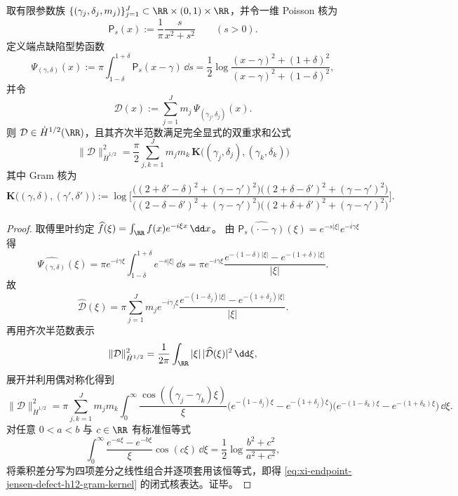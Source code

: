 \begin{proposition}\label{prop:xi-endpoint-jensen-defect-h12-gram-kernel}
取有限参数族 \(\{(\gamma_j,\delta_j,m_j)\}_{j=1}^{J}\subset \RR\times(0,1)\times\RR\)，并令一维 Poisson 核为
\[
\mathsf P_s(x):=\frac{1}{\pi}\frac{s}{x^2+s^2}\qquad(s>0).
\]
定义端点缺陷型势函数
\[
\Psi_{(\gamma,\delta)}(x)
:=\pi\int_{1-\delta}^{1+\delta}\mathsf P_s(x-\gamma)\,\dd s
=\frac12\log\frac{(x-\gamma)^2+(1+\delta)^2}{(x-\gamma)^2+(1-\delta)^2},
\]
并令
\[
\mathcal D(x):=\sum_{j=1}^{J} m_j\,\Psi_{(\gamma_j,\delta_j)}(x).
\]
则 \(\mathcal D\in \dot H^{1/2}(\RR)\)，且其齐次半范数满足完全显式的双重求和公式
\begin{equation}\label{eq:xi-endpoint-jensen-defect-h12-gram-kernel}
\boxed{\;
\|\mathcal D\|_{\dot H^{1/2}}^2
=\frac{\pi}{2}\sum_{j,k=1}^{J} m_jm_k\,\mathbf K\!\bigl((\gamma_j,\delta_j),(\gamma_k,\delta_k)\bigr)\;}
\end{equation}
其中 Gram 核为
\[
\mathbf K\!\bigl((\gamma,\delta),(\gamma',\delta')\bigr)
:=\log\!\Bigg[
\frac{\bigl((2+\delta'-\delta)^2+(\gamma-\gamma')^2\bigr)\bigl((2+\delta-\delta')^2+(\gamma-\gamma')^2\bigr)}
{\bigl((2-\delta-\delta')^2+(\gamma-\gamma')^2\bigr)\bigl((2+\delta+\delta')^2+(\gamma-\gamma')^2\bigr)}
\Bigg].
\]
\end{proposition}
\begin{proof}
取傅里叶约定 \(\widehat f(\xi)=\int_{\RR}f(x)e^{-i\xi x}\,\dd x\)。
由 \(\widehat{\mathsf P_s(\cdot-\gamma)}(\xi)=e^{-s|\xi|}e^{-i\gamma\xi}\) 得
\[
\widehat{\Psi_{(\gamma,\delta)}}(\xi)
=\pi e^{-i\gamma\xi}\int_{1-\delta}^{1+\delta}e^{-s|\xi|}\,\dd s
=\pi e^{-i\gamma\xi}\frac{e^{-(1-\delta)|\xi|}-e^{-(1+\delta)|\xi|}}{|\xi|}.
\]
故
\[
\widehat{\mathcal D}(\xi)
=\pi\sum_{j=1}^{J} m_j e^{-i\gamma_j\xi}\frac{e^{-(1-\delta_j)|\xi|}-e^{-(1+\delta_j)|\xi|}}{|\xi|}.
\]
再用齐次半范数表示
\[
\|\mathcal D\|_{\dot H^{1/2}}^2=\frac{1}{2\pi}\int_{\RR}|\xi|\,|\widehat{\mathcal D}(\xi)|^2\,\dd\xi,
\]
展开并利用偶对称化得到
\[
\|\mathcal D\|_{\dot H^{1/2}}^2
=\pi\sum_{j,k=1}^{J}m_jm_k\int_0^\infty \frac{\cos((\gamma_j-\gamma_k)\xi)}{\xi}
\bigl(e^{-(1-\delta_j)\xi}-e^{-(1+\delta_j)\xi}\bigr)\bigl(e^{-(1-\delta_k)\xi}-e^{-(1+\delta_k)\xi}\bigr)\,\dd\xi.
\]
对任意 \(0<a<b\) 与 \(c\in\RR\) 有标准恒等式
\[
\int_0^\infty \frac{e^{-a\xi}-e^{-b\xi}}{\xi}\cos(c\xi)\,\dd\xi
=\frac12\log\frac{b^2+c^2}{a^2+c^2},
\]
将乘积差分写为四项差分之线性组合并逐项套用该恒等式，即得 \eqref{eq:xi-endpoint-jensen-defect-h12-gram-kernel} 的闭式核表达。证毕。
\end{proof}

